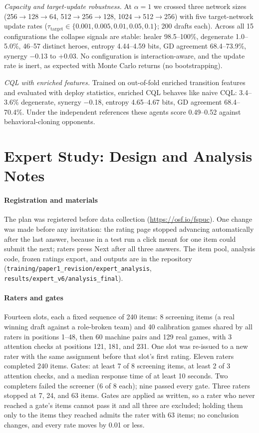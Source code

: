 \documentclass[journal]{IEEEtran}
\begin{document}
\textit{Capacity and target-update robustness.} At $\alpha = 1$ we crossed three network sizes (256$\to$128$\to$64, 512$\to$256$\to$128, 1024$\to$512$\to$256) with five target-network update rates ($\tau_{\text{target}} \in \{0.001, 0.005, 0.01, 0.05, 0.1\}$; 200 drafts each). Across all 15 configurations the collapse signals are stable: healer 98.5--100\%, degenerate 1.0--5.0\%, 46--57 distinct heroes, entropy 4.44--4.59 bits, GD agreement 68.4--73.9\%, synergy $-$0.13 to +0.03. No configuration is interaction-aware, and the update rate is inert, as expected with Monte Carlo returns (no bootstrapping).

\textit{CQL with enriched features.} Trained on out-of-fold enriched transition features and evaluated with deploy statistics, enriched CQL behaves like naive CQL: 3.4--3.6\% degenerate, synergy $-$0.18, entropy 4.65--4.67 bits, GD agreement 68.4--70.4\%. Under the independent references these agents score 0.49--0.52 against behavioral-cloning opponents.

\section{Expert Study: Design and Analysis Notes}

\paragraph{Registration and materials} The plan was registered before data collection (\url{https://osf.io/fspuc}). One change was made before any invitation: the rating page stopped advancing automatically after the last answer, because in a test run a click meant for one item could submit the next; raters press Next after all three answers. The item pool, analysis code, frozen ratings export, and outputs are in the repository (\texttt{training/paper1\_revision/expert\_analysis}, \texttt{results/expert\_v6/analysis\_final}).

\paragraph{Raters and gates} Fourteen slots, each a fixed sequence of 240 items: 8 screening items (a real winning draft against a role-broken team) and 40 calibration games shared by all raters in positions 1--48, then 60 machine pairs and 129 real games, with 3 attention checks at positions 121, 181, and 231. One slot was re-issued to a new rater with the same assignment before that slot's first rating. Eleven raters completed 240 items. Gates: at least 7 of 8 screening items, at least 2 of 3 attention checks, and a median response time of at least 10 seconds. Two completers failed the screener (6 of 8 each); nine passed every gate. Three raters stopped at 7, 24, and 63 items. Gates are applied as written, so a rater who never reached a gate's items cannot pass it and all three are excluded; holding them only to the items they reached admits the rater with 63 items; no conclusion changes, and every rate moves by 0.01 or less.
\end{document}
